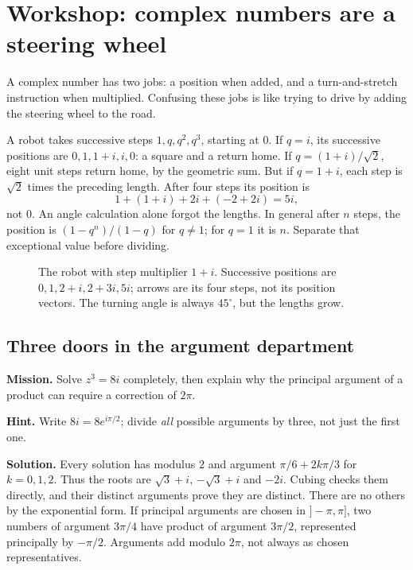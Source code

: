 
\section{Workshop: complex numbers are a steering wheel}
A complex number has two jobs: a position when added, and a turn-and-stretch instruction when multiplied. Confusing these jobs is like trying to drive by adding the steering wheel to the road.

\begin{examplex}
A robot takes successive steps $1,q,q^2,q^3$, starting at $0$. If $q=i$, its successive positions are $0,1,1+i,i,0$: a square and a return home. If $q=(1+i)/\sqrt2$, eight unit steps return home, by the geometric sum. But if $q=1+i$, each step is $\sqrt2$ times the preceding length. After four steps its position is
\[
1+(1+i)+2i+(-2+2i)=5i,
\]
not $0$. An angle calculation alone forgot the lengths. In general after $n$ steps, the position is $(1-q^n)/(1-q)$ for $q\ne1$; for $q=1$ it is $n$. Separate that exceptional value before dividing.
\end{examplex}

\begin{figure}[ht]\centering{}
\caption{The robot with step multiplier $1+i$. Successive positions are $0,1,2+i,2+3i,5i$; arrows are its four steps, not its position vectors. The turning angle is always $45^\circ$, but the lengths grow.}\end{figure}

\subsection*{Three doors in the argument department}
\textbf{Mission.} Solve $z^3=8i$ completely, then explain why the principal argument of a product can require a correction of $2\pi$.

\textbf{Hint.} Write $8i=8e^{i\pi/2}$; divide \emph{all} possible arguments by three, not just the first one.

\textbf{Solution.} Every solution has modulus $2$ and argument $\pi/6+2k\pi/3$ for $k=0,1,2$. Thus the roots are $\sqrt3+i$, $-\sqrt3+i$ and $-2i$. Cubing checks them directly, and their distinct arguments prove they are distinct. There are no others by the exponential form. If principal arguments are chosen in $]-\pi,\pi]$, two numbers of argument $3\pi/4$ have product of argument $3\pi/2$, represented principally by $-\pi/2$. Arguments add modulo $2\pi$, not always as chosen representatives.

